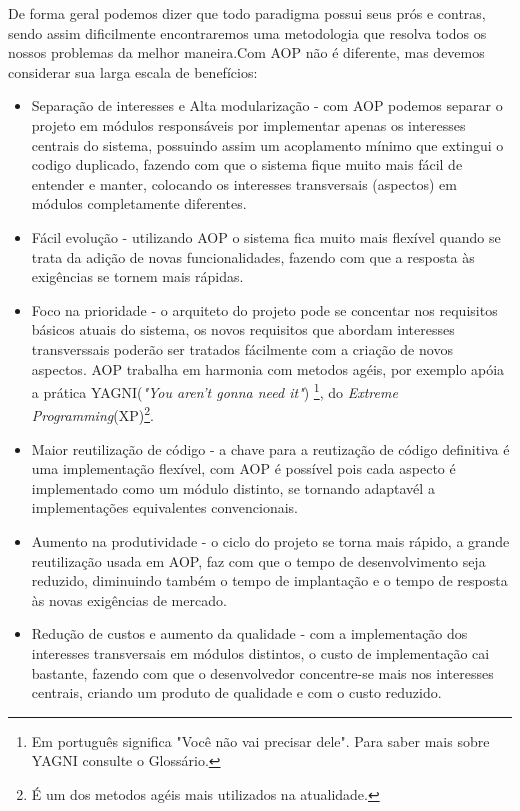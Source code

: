 \documentclass[tc,openright]{iiufrgs}
\begin{document}
De forma geral podemos dizer que todo paradigma possui seus prós e contras, sendo assim dificilmente encontraremos uma metodologia que resolva todos os nossos problemas da melhor maneira.Com AOP não é diferente, mas devemos considerar sua larga escala de benefícios:

\begin{itemize}
\item Separação de interesses e Alta modularização - com AOP podemos separar o projeto em módulos responsáveis por implementar apenas os interesses centrais do sistema, possuindo assim um acoplamento mínimo que extingui o codigo duplicado, fazendo com que o sistema fique muito mais fácil de entender e manter, colocando os interesses transversais (aspectos) em módulos completamente diferentes.\cite{laddad2003aspectj} 
\item Fácil evolução - utilizando AOP o sistema fica muito mais flexível quando se trata da adição de novas funcionalidades, fazendo com que a resposta às exigências se tornem mais rápidas.
\item Foco na prioridade - o arquiteto do projeto pode se concentar nos requisitos básicos atuais do sistema, os novos requisitos que abordam interesses transverssais poderão ser tratados fácilmente com a criação de novos aspectos. AOP trabalha em harmonia com metodos agéis, por exemplo apóia a prática YAGNI(\textit{"You aren’t gonna need it"}) \footnote{Em português significa "Você não vai precisar dele". Para saber mais sobre YAGNI consulte o Glossário.}, do \textit{Extreme Programming}(XP)\footnote{É um dos metodos agéis mais utilizados na atualidade.}.\cite{laddad2003aspectj} 
\item Maior reutilização de código - a chave para a reutização de código definitiva é uma implementação flexível, com AOP é possível pois cada aspecto é implementado como um módulo distinto, se tornando adaptavél a implementações equivalentes convencionais.\cite{laddad2003aspectj} 
\item Aumento na produtividade - o ciclo do projeto se torna mais rápido, a grande reutilização usada em AOP, faz com que o tempo de desenvolvimento seja reduzido, diminuindo também o tempo de implantação e o tempo de resposta às novas exigências de mercado. \cite{laddad2003aspectj} 
\item Redução de custos e aumento da qualidade - com a implementação dos interesses transversais em módulos distintos, o custo de implementação cai bastante, fazendo com que o desenvolvedor concentre-se mais nos interesses centrais, criando um produto de qualidade e com o custo reduzido.
\end{itemize}
\end{document}
